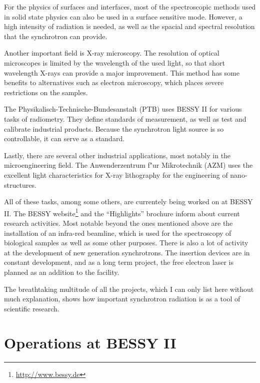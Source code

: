 \documentclass[a4paper,10pt]{article}
\begin{document}
    For the physics of surfaces and interfaces, most of the spectroscopic
methods used in solid state physics can also be used in a surface sensitive
mode. However, a high intensity of radiation is needed, as well as the spacial
and spectral resolution that the synchrotron can provide.

    Another important field is X-ray microscopy. The resolution of optical
microscopes is limited by the wavelength of the used light, so that short
wavelength X-rays can provide a major improvement. This method has some
benefits to alternatives such as electron microscopy, which places severe
restrictions on the samples.

    The Physikalisch-Technische-Bundesanstalt (PTB) uses BESSY II for various
tasks of radiometry. They define standards of measurement, as well as test and
calibrate industrial products. Because the synchrotron light source is so
controllable, it can serve as a standard.

    Lastly, there are several other industrial applications, most notably in
the microengineering field. The Anwenderzentrum f"ur Mikrotechnik (AZM) uses
the excellent light characteristics for X-ray lithography for the engineering
of nano-structures.

    All of these tasks, among some others, are currentely being worked on at
BESSY II. The BESSY website\footnote{\url{http://www.bessy.de}} and
the ``Highlights'' brochure \citep{bessy_highlights2006} inform about current
research activities. Most notable beyond the ones mentioned above are the
installation of an infra-red beamline, which is used for the spectroscopy of
biological samples as well as some other purposes. There is also a lot of
activity at the development of new generation synchrotrons. The insertion
devices are in constant development, and as a long term project, the free
electron laser \citep{bessyfel} is planned as an addition to the
facility.

    The breathtaking multitude of all the projects, which I can only list here
without much explanation, shows how important synchrotron radiation is as a
tool of scientific research.








\section{Operations at BESSY II} \label{Operations at BESSY II}
\end{document}
